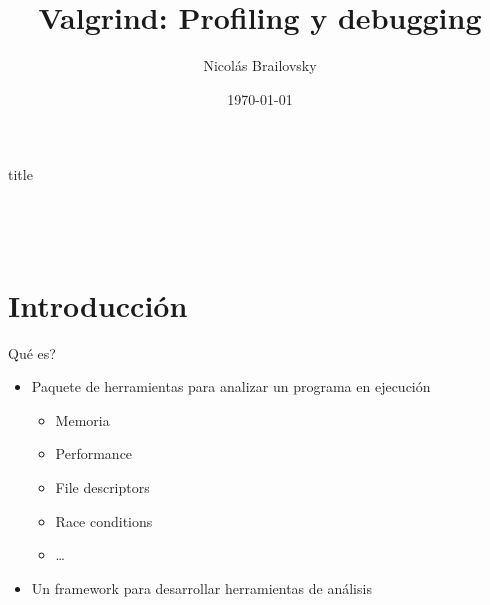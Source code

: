 \documentclass{beamer}
\institute[IWay Tech Talks]{IWay Tech Talks}
\date[] {\today}
\title[Valgrind]{Valgrind: Profiling y debugging}
\subtitle{}
\author[]{Nicol\'as Brailovsky}
\begin{document}
\begin{frame}[plain]
	\begin{center}  \end{center}
	\rule{0em}{5pt}

	\begin{beamercolorbox}[sep=.1cm,shadow=true,rounded=true,center]{title}
		\inserttitle
	\end{beamercolorbox}

	\begin{columns}[onlytextwidth]
		\begin{center}
		\end{center}
		\begin{center} {\color{orange} \insertinstitute }  \end{center}
	\end{columns}

	\begin{center}
		{\color{orange} 
			\insertauthor \\
			\rule{0em}{8pt}
			\insertdate
		}
	\end{center}
\end{frame}

\begin{frame}
  \tableofcontents
\end{frame}


\section{Introducci\'on}

\begin{frame}{\textquestiondown Qu\'e es?}
\begin{itemize}
  \item Paquete de herramientas para analizar un programa en ejecuci\'on
  \begin{itemize}
    \item Memoria
    \item Performance
    \item File descriptors
    \item Race conditions
    \item \ldots
  \end{itemize}
  \item Un framework para desarrollar herramientas de an\'alisis
\end{itemize}
\end{frame}
\end{document}
